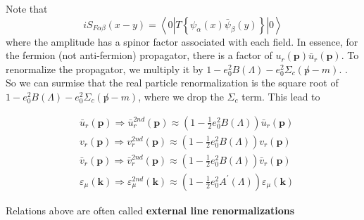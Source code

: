 Note that 
$$i S_{F \alpha \beta}(x-y)=\left\langle 0\left|T\left\{\psi_{\alpha}(x) \bar{\psi}_{\beta}(y)\right\}\right| 0\right\rangle$$
where the amplitude has a spinor factor associated with each field. In essence, for the fermion (not anti-fermion) propagator, there is a factor of $u_{r}(\mathbf{p}) \bar{u}_{r}(\mathbf{p})$. To renormalize the propagator, we multiply it by $1-e_{0}^{2} B(\Lambda)-e_{0}^{2} \Sigma_{c}(\not p-m)$. \textbf{}. So we can surmise that the real particle renormalization is the square root of $1-e_{0}^{2} B(\Lambda)-e_{0}^{2} \Sigma_{c}(\not p-m)$, where we drop the $\Sigma_c$ term. This lead to
\begin{qt}
    \begin{equation}\begin{aligned}
&\bar{u}_{r}(\mathbf{p}) \Rightarrow \bar{u}_{r}^{2 n d}(\mathbf{p}) \approx\left(1-\frac{1}{2} e_{0}^{2} B(\Lambda)\right) \bar{u}_{r}(\mathbf{p})\\
&v_{r}(\mathbf{p}) \Rightarrow v_{r}^{2 n d}(\mathbf{p}) \approx\left(1-\frac{1}{2} e_{0}^{2} B(\Lambda)\right) v_{r}(\mathbf{p})\\
&\bar{v}_{r}(\mathbf{p}) \Rightarrow \bar{v}_{r}^{2 n d}(\mathbf{p}) \approx\left(1-\frac{1}{2} e_{0}^{2} B(\Lambda)\right) \bar{v}_{r}(\mathbf{p})\\
&\varepsilon_{\mu}(\mathbf{k}) \Rightarrow \varepsilon_{\mu}^{2 n d}(\mathbf{k}) \approx\left(1-\frac{1}{2} e_{0}^{2} A^{\prime}(\Lambda)\right) \varepsilon_{\mu}(\mathbf{k})
\end{aligned}\end{equation}
\end{qt}
Relations above are often called \textbf{external line renormalizations}


